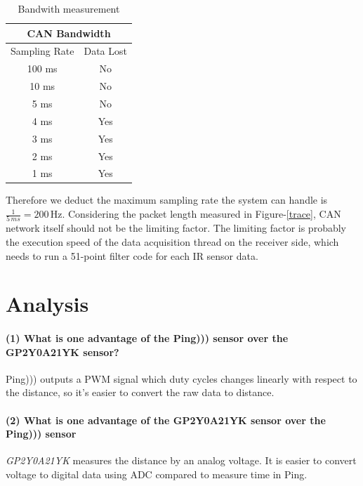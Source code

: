 \documentclass[a4paper]{article}
\begin{document}
\begin{table}
\center
  \begin{tabular}{|c|c|}
    \hline
    \multicolumn{2}{|c|}{CAN Bandwidth} \\
    \hline
    Sampling Rate  & Data Lost \\
    \hline
	100 ms &   No \\
	10 ms  &   No \\
	5 ms   &   No \\
	4 ms   &   Yes \\
	3 ms   &   Yes \\
	2 ms   &   Yes \\
	1 ms   &   Yes \\
    \hline
  \end{tabular}
  \caption{Bandwith measurement}
  \label{tab1}
\end{table}

Therefore we deduct the maximum sampling rate the system can handle is $\frac{1}{5 \, ms} = 200 \, \text{Hz}$.
Considering the packet length measured in Figure-\ref{trace}, CAN network itself should not be the limiting factor.
The limiting factor is probably the execution speed of the data acquisition thread on the receiver side, which
needs to run a 51-point filter code for each IR sensor data.

\section{Analysis}

\paragraph{(1) What is one advantage of the Ping))) sensor over the GP2Y0A21YK sensor? \\ }

Ping))) outputs a PWM signal which duty cycles changes linearly with respect to the distance, so it's easier to convert the raw data to distance.

\paragraph{(2) What is one advantage of the \textbf{GP2Y0A21YK} sensor over the Ping))) sensor \\ }

\emph{GP2Y0A21YK} measures the distance by an analog voltage. It is easier to convert voltage to digital data using ADC compared to measure time in Ping.
\end{document}

